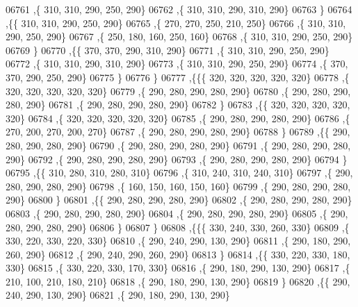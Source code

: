 \begin{DoxyCode}
06761     ,\{   310,   310,   290,   250,   290\}
06762     ,\{   310,   310,   290,   310,   290\}
06763     \}
06764    ,\{\{   310,   310,   290,   250,   290\}
06765     ,\{   270,   270,   250,   210,   250\}
06766     ,\{   310,   310,   290,   250,   290\}
06767     ,\{   250,   180,   160,   250,   160\}
06768     ,\{   310,   310,   290,   250,   290\}
06769     \}
06770    ,\{\{   370,   370,   290,   310,   290\}
06771     ,\{   310,   310,   290,   250,   290\}
06772     ,\{   310,   310,   290,   310,   290\}
06773     ,\{   310,   310,   290,   250,   290\}
06774     ,\{   370,   370,   290,   250,   290\}
06775     \}
06776    \}
06777   ,\{\{\{   320,   320,   320,   320,   320\}
06778     ,\{   320,   320,   320,   320,   320\}
06779     ,\{   290,   280,   290,   280,   290\}
06780     ,\{   290,   280,   290,   280,   290\}
06781     ,\{   290,   280,   290,   280,   290\}
06782     \}
06783    ,\{\{   320,   320,   320,   320,   320\}
06784     ,\{   320,   320,   320,   320,   320\}
06785     ,\{   290,   280,   290,   280,   290\}
06786     ,\{   270,   200,   270,   200,   270\}
06787     ,\{   290,   280,   290,   280,   290\}
06788     \}
06789    ,\{\{   290,   280,   290,   280,   290\}
06790     ,\{   290,   280,   290,   280,   290\}
06791     ,\{   290,   280,   290,   280,   290\}
06792     ,\{   290,   280,   290,   280,   290\}
06793     ,\{   290,   280,   290,   280,   290\}
06794     \}
06795    ,\{\{   310,   280,   310,   280,   310\}
06796     ,\{   310,   240,   310,   240,   310\}
06797     ,\{   290,   280,   290,   280,   290\}
06798     ,\{   160,   150,   160,   150,   160\}
06799     ,\{   290,   280,   290,   280,   290\}
06800     \}
06801    ,\{\{   290,   280,   290,   280,   290\}
06802     ,\{   290,   280,   290,   280,   290\}
06803     ,\{   290,   280,   290,   280,   290\}
06804     ,\{   290,   280,   290,   280,   290\}
06805     ,\{   290,   280,   290,   280,   290\}
06806     \}
06807    \}
06808   ,\{\{\{   330,   240,   330,   260,   330\}
06809     ,\{   330,   220,   330,   220,   330\}
06810     ,\{   290,   240,   290,   130,   290\}
06811     ,\{   290,   180,   290,   260,   290\}
06812     ,\{   290,   240,   290,   260,   290\}
06813     \}
06814    ,\{\{   330,   220,   330,   180,   330\}
06815     ,\{   330,   220,   330,   170,   330\}
06816     ,\{   290,   180,   290,   130,   290\}
06817     ,\{   210,   100,   210,   180,   210\}
06818     ,\{   290,   180,   290,   130,   290\}
06819     \}
06820    ,\{\{   290,   240,   290,   130,   290\}
06821     ,\{   290,   180,   290,   130,   290\}

\end{DoxyCode}
